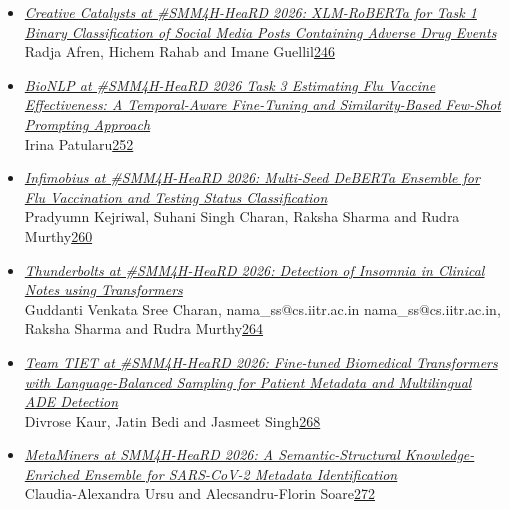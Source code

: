 \documentclass[11pt,oneside]{book}
\begin{document}
\begin{itemize}[leftmargin=*,label={}]
       \item \hyperlink{page.246}{\emph{Creative Catalysts at \#SMM4H-HeaRD 2026: XLM-RoBERTa for Task 1 Binary Classification of Social Media Posts Containing Adverse Drug Events}}\\ \hspace*{2em} Radja Afren, Hichem Rahab and Imane Guellil\dotfill \hyperlink{page.246}{246}
       \item \hyperlink{page.252}{\emph{BioNLP at \#SMM4H-HeaRD 2026 Task 3 Estimating Flu Vaccine Effectiveness: A Temporal-Aware Fine-Tuning and Similarity-Based Few-Shot Prompting Approach}}\\ \hspace*{2em} Irina Patularu\dotfill \hyperlink{page.252}{252}
       \item \hyperlink{page.260}{\emph{Infimobius at \#SMM4H-HeaRD 2026: Multi-Seed DeBERTa Ensemble for Flu Vaccination and Testing Status Classification}}\\ \hspace*{2em} Pradyumn Kejriwal, Suhani Singh Charan, Raksha Sharma and Rudra Murthy\dotfill \hyperlink{page.260}{260}
       \item \hyperlink{page.264}{\emph{Thunderbolts at \#SMM4H-HeaRD 2026: Detection of Insomnia in Clinical Notes using Transformers}}\\ \hspace*{2em} Guddanti Venkata Sree Charan, nama\_ss@cs.iitr.ac.in nama\_ss@cs.iitr.ac.in, Raksha Sharma and Rudra Murthy\dotfill \hyperlink{page.264}{264}
       \item \hyperlink{page.268}{\emph{Team TIET at \#SMM4H-HeaRD 2026: Fine-tuned Biomedical Transformers with Language-Balanced Sampling for Patient Metadata and Multilingual ADE Detection}}\\ \hspace*{2em} Divrose Kaur, Jatin Bedi and Jasmeet Singh\dotfill \hyperlink{page.268}{268}
       \item \hyperlink{page.272}{\emph{MetaMiners at SMM4H-HeaRD 2026: A Semantic-Structural Knowledge-Enriched Ensemble for SARS-CoV-2 Metadata Identification}}\\ \hspace*{2em} Claudia-Alexandra Ursu and Alecsandru-Florin Soare\dotfill \hyperlink{page.272}{272}

\end{itemize}
\end{document}

